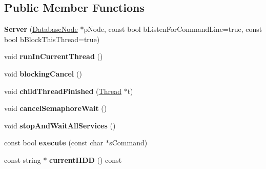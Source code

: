 \subsection*{\-Public \-Member \-Functions}
\begin{DoxyCompactItemize}
\item 
\hypertarget{classgeneral__server_1_1Server_ac3982fe9c97002cf885a7bb289cecc07}{{\bfseries \-Server} (\hyperlink{classgeneral__server_1_1DatabaseNode}{\-Database\-Node} $\ast$p\-Node, const bool b\-Listen\-For\-Command\-Line=true, const bool b\-Block\-This\-Thread=true)}\label{classgeneral__server_1_1Server_ac3982fe9c97002cf885a7bb289cecc07}

\item 
\hypertarget{classgeneral__server_1_1Server_ad850e1d87d66d718bdcb7dcd1de8099b}{void {\bfseries run\-In\-Current\-Thread} ()}\label{classgeneral__server_1_1Server_ad850e1d87d66d718bdcb7dcd1de8099b}

\item 
\hypertarget{classgeneral__server_1_1Server_abedcede785a8758c78ea4d973e3b1eec}{void {\bfseries blocking\-Cancel} ()}\label{classgeneral__server_1_1Server_abedcede785a8758c78ea4d973e3b1eec}

\item 
\hypertarget{classgeneral__server_1_1Server_af1a652f3821cc01239f546d0cd3e05e1}{void {\bfseries child\-Thread\-Finished} (\hyperlink{classgeneral__server_1_1Thread}{\-Thread} $\ast$t)}\label{classgeneral__server_1_1Server_af1a652f3821cc01239f546d0cd3e05e1}

\item 
\hypertarget{classgeneral__server_1_1Server_a89d4851b72b79f6b71f9b4d22790ad7d}{void {\bfseries cancel\-Semaphore\-Wait} ()}\label{classgeneral__server_1_1Server_a89d4851b72b79f6b71f9b4d22790ad7d}

\item 
\hypertarget{classgeneral__server_1_1Server_aa936bb09de444502fff11a4c6e8a523c}{void {\bfseries stop\-And\-Wait\-All\-Services} ()}\label{classgeneral__server_1_1Server_aa936bb09de444502fff11a4c6e8a523c}

\item 
\hypertarget{classgeneral__server_1_1Server_ad8a2b25ce9d3eddd5eb49ca2aa42b96b}{const bool {\bfseries execute} (const char $\ast$s\-Command)}\label{classgeneral__server_1_1Server_ad8a2b25ce9d3eddd5eb49ca2aa42b96b}

\item 
\hypertarget{classgeneral__server_1_1Server_a17b1059361e5fc1800ddae43c2963ee8}{const string $\ast$ {\bfseries current\-H\-D\-D} () const }\label{classgeneral__server_1_1Server_a17b1059361e5fc1800ddae43c2963ee8}


\end{DoxyCompactItemize}

